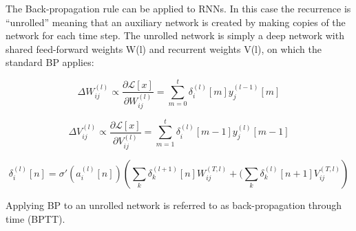 \documentclass[main]{subfiles}
\begin{document}
The Back-propagation rule can be applied to RNNs. In this case the recurrence is “unrolled” meaning that an auxiliary network is created by making copies of the network for each time step. The unrolled network is simply a deep network with shared feed-forward weights W(l) and recurrent weights V(l), on which the standard BP applies:

\begin{equation}
    \Delta W_{ij}^{(l)} \propto \frac{\partial \mathcal{L}[x]}{\partial W_{ij}^{(l)}} = \sum_{m=0}^t\delta_i^{(l)}[m]y_j^{(l-1)}[m]
\end{equation}

\begin{equation}
    \Delta V_{ij}^{(l)} \propto \frac{\partial \mathcal{L}[x]}{\partial V_{ij}^{(l)}} = \sum_{m=1}^t\delta_i^{(l)}[m-1]y_j^{(l)}[m-1]
\end{equation}

\begin{equation}
    \delta_{i}^{(l)}[n] = \sigma'\left(a_i^{(l)}[n]\right)\left(\sum_{k}\delta_k^{(l+1)}[n]W_{ij}^{(T,l)}+ (\sum_{k}\delta_k^{(l)}[n+1]V_{ij}^{(T,l)}\right)
\end{equation}

Applying BP to an unrolled network is referred to as back-propagation through time (BPTT).
\end{document}
